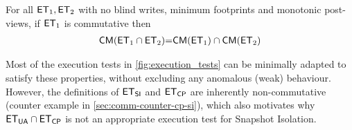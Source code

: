 \begin{theorem}[Compositionality]     
For all $\mathsf{ET}_1, \mathsf{ET}_2$ with no blind writes, minimum footprints and monotonic post-views, 
if $\mathsf{ET}_1$ is commutative then
\begin{align*}
 \mathsf{CM}(\mathsf{ET}_1 \cap \mathsf{ET}_2) {=} \mathsf{CM}(\mathsf{ET}_1) \cap \mathsf{CM}(\mathsf{ET}_2)
\end{align*}
\end{theorem}
Most of the execution tests in \cref{fig:execution_tests} can be minimally adapted to satisfy these 
properties, without excluding any anomalous (weak) behaviour. However, the definitions 
of $\mathsf{ET}_{\mathsf{SI}}$ and $\mathsf{ET}_{\mathsf{CP}}$ are inherently non-commutative (counter example in \cref{sec:comm-counter-cp-si}), which also motivates 
why $\mathsf{ET}_{\mathsf{UA}} \cap \mathsf{ET}_{\mathsf{CP}}$ is not an appropriate execution test for Snapshot Isolation.


